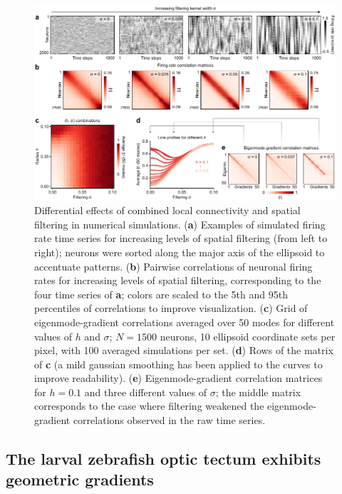 \documentclass{article}
\begin{document}
\begin{figure}[t]
    \centering
    \includegraphics[width=1.0\linewidth]{figures/figure5.pdf}
    \caption{Differential effects of combined local connectivity and spatial filtering in numerical simulations. (\textbf{a}) Examples of simulated firing rate time series for increasing levels of spatial filtering (from left to right); neurons were sorted along the major axis of the ellipsoid to accentuate patterns. (\textbf{b}) Pairwise correlations of neuronal firing rates for increasing levels of spatial filtering, corresponding to the four time series of \textbf{a}; colors are scaled to the 5th and 95th percentiles of correlations to improve visualization. (\textbf{c}) Grid of eigenmode-gradient correlations averaged over 50 modes for different values of $h$ and $\sigma$; $N=1500$ neurons, 10 ellipsoid coordinate sets per pixel, with 100 averaged simulations per set. (\textbf{d}) Rows of the matrix of \textbf{c} (a mild gaussian smoothing has been applied to the curves to improve readability). (\textbf{e}) Eigenmode-gradient correlation matrices for $h=0.1$ and three different values of $\sigma$; the middle matrix corresponds to the case where filtering weakened the eigenmode-gradient correlations observed in the raw time series.}
    \label{fig5}
    \hrulefill
\end{figure}

\subsection*{The larval zebrafish optic tectum exhibits geometric gradients}
\end{document}
